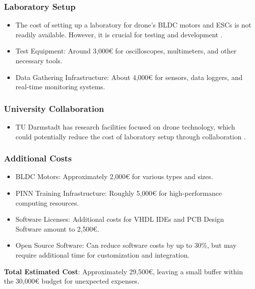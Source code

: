 \documentclass[12pt]{article}
\begin{document}
		\subsubsection{Laboratory Setup}
		\begin{itemize}
			\item The cost of setting up a laboratory for drone's BLDC motors and ESCs is not readily available. However, it is crucial for testing and development \cite{lab-setup}.
			\item Test Equipment: Around 3,000€ for oscilloscopes, multimeters, and other necessary tools.
			\item Data Gathering Infrastructure: About 4,000€ for sensors, data loggers, and real-time monitoring systems.
		\end{itemize}
		
		\subsubsection{University Collaboration}
		\begin{itemize}
			\item TU Darmstadt has research facilities focused on drone technology, which could potentially reduce the cost of laboratory setup through collaboration \cite{tu-darmstadt}.
		\end{itemize}
		
		\subsubsection{Additional Costs}
		\begin{itemize}
			\item BLDC Motors: Approximately 2,000€ for various types and sizes.
			\item PINN Training Infrastructure: Roughly 5,000€ for high-performance computing resources.
			\item Software Licenses: Additional costs for VHDL IDEs and PCB Design Software amount to 2,500€.
			\item Open Source Software: Can reduce software costs by up to 30\%, but may require additional time for customization and integration.
		\end{itemize}
		
		\textbf{Total Estimated Cost}: Approximately 29,500€, leaving a small buffer within the 30,000€ budget for unexpected expenses.
		
\end{document}
